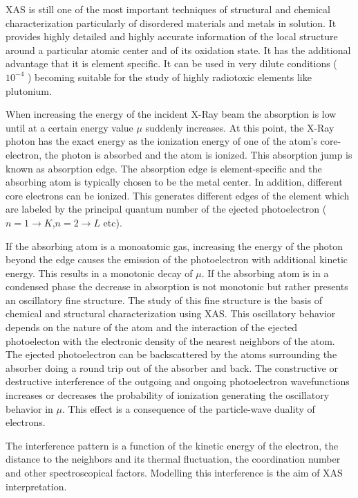 XAS is still one of the most important techniques of structural and chemical characterization 
particularly of disordered materials and metals in solution. It provides highly detailed and 
highly accurate information of the local structure around a particular atomic center and of 
its oxidation state. It has the additional advantage that it is element specific. It can be 
used in very dilute conditions ( $10^{-4}$\si{\molar} ) becoming suitable for the study of 
highly radiotoxic elements like plutonium.

When increasing the energy of the incident X-Ray beam the absorption is low until at 
a certain energy value $\mu$ suddenly increases. At this point, the X-Ray photon has 
the exact energy as the ionization energy of one of the atom's core-electron, the photon is 
absorbed 
and the atom is ionized. This absorption jump is known as absorption edge. The absorption edge is 
element-specific and the absorbing atom is typically chosen to be the metal center. In addition, 
different core 
electrons can be ionized. This generates different edges of the element which are 
labeled by the principal quantum number of the ejected photoelectron ($n=1 \rightarrow 
K$,$n=2\rightarrow L$ 
etc). 

If the absorbing atom is a monoatomic gas, increasing the energy of the 
photon beyond the edge causes the emission of the photoelectron with additional kinetic 
energy. This results in a monotonic decay of $\mu$. If the absorbing atom 
is in a condensed phase the decrease in absorption is not monotonic but 
rather presents an oscillatory fine structure. The study of this fine structure is the basis 
of chemical and structural characterization using XAS. This oscillatory behavior depends on the 
nature of the atom and the interaction of the ejected photoelecton with the electronic density of 
the nearest neighbors of the atom. The ejected photoelectron can be backscattered by the
atoms surrounding the absorber doing a round trip out of the absorber and back. The 
constructive or destructive interference of the outgoing and ongoing photoelectron wavefunctions 
increases or decreases the probability of ionization generating the oscillatory 
behavior in $\mu$. This effect is a consequence of the particle-wave duality of electrons. 

The interference pattern is a function of the kinetic energy of the electron, the distance to the 
neighbors and its thermal fluctuation, the coordination number and other spectroscopical factors. 
Modelling this interference is the 
aim of XAS interpretation. 


